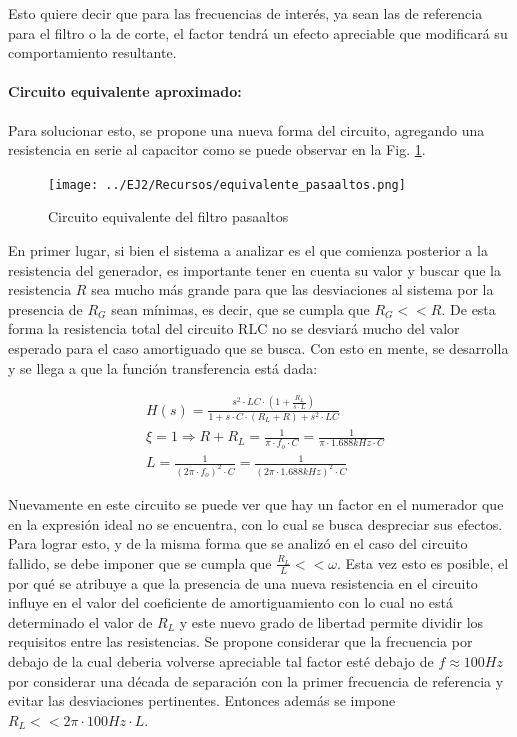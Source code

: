 Esto quiere decir que para las frecuencias de inter\'es, ya sean las de referencia para el filtro o la de corte, el factor tendr\'a un efecto apreciable que modificar\'a
su comportamiento resultante. 

\paragraph*{Circuito equivalente aproximado:} Para solucionar esto, se propone una nueva forma del circuito, agregando una resistencia en serie al capacitor como se puede observar en la Fig. \ref{fig:equivalente_pasaaltos}.

\begin{figure}[H]
    \centering
    \texttt{[image: ../EJ2/Recursos/equivalente\_pasaaltos.png]}
    \caption{Circuito equivalente del filtro pasaaltos}
    \label{fig:equivalente_pasaaltos}
\end{figure}

En primer lugar, si bien el sistema a analizar es el que comienza posterior a la resistencia del generador, es importante tener en cuenta su valor y buscar que la resistencia
$R$ sea mucho m\'as grande para que las desviaciones al sistema por la presencia de $R_G$ sean m\'inimas, es decir, que se cumpla que $R_G << R$. De esta forma la resistencia total
del circuito RLC no se desviar\'a mucho del valor esperado para el caso amortiguado que se busca. Con esto en mente, se desarrolla y se llega a que la funci\'on transferencia est\'a dada:

\begin{align}
    & H(s) = \frac{s^{2} \cdot LC \cdot (1 + \frac{R_L}{s \cdot L})}{1 + s \cdot C \cdot (R_L + R) + s^{2} \cdot LC} \\
    & \xi = 1 \Rightarrow R + R_L = \frac{1}{\pi \cdot f_o \cdot C} = \frac{1}{\pi \cdot 1.688kHz \cdot C}\\
    & L = \frac{1}{(2 \pi \cdot f_o)^{2} \cdot C} = \frac{1}{(2 \pi \cdot 1.688kHz)^{2} \cdot C}
\end{align}

Nuevamente en este circuito se puede ver que hay un factor en el numerador que en la expresi\'on ideal no se encuentra, con lo cual se busca despreciar sus efectos. Para lograr esto, y de la misma forma que se analiz\'o en el caso del circuito fallido,
se debe imponer que se cumpla que $\frac{R_L}{L} << \omega$. Esta vez esto es posible, el por qu\'e se atribuye a que la presencia de una nueva resistencia en el circuito influye en el valor del coeficiente de amortiguamiento con lo cual no est\'a determinado
el valor de $R_L$ y este nuevo grado de libertad permite dividir los requisitos entre las resistencias. Se propone considerar que la frecuencia por debajo de la cual deberia volverse apreciable tal factor est\'e debajo de $f \approx 100Hz$ por considerar una d\'ecada
de separaci\'on con la primer frecuencia de referencia y evitar las desviaciones pertinentes. Entonces adem\'as se impone $R_L << 2\pi \cdot 100Hz \cdot L$.

